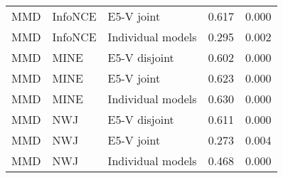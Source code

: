\begin{table}[htb]
\begin{tabular}{@{}lll|cc@{}}
MMD           & InfoNCE      & E5-V joint         & 0.617 & 0.000 \\
MMD           & InfoNCE      & Individual models & 0.295 & 0.002 \\
MMD           & MINE         & E5-V disjoint      & 0.602 & 0.000 \\
MMD           & MINE         & E5-V joint         & 0.623 & 0.000 \\
MMD           & MINE         & Individual models & 0.630 & 0.000 \\
MMD           & NWJ          & E5-V disjoint      & 0.611 & 0.000 \\
MMD           & NWJ          & E5-V joint         & 0.273 & 0.004 \\
MMD           & NWJ          & Individual models & 0.468 & 0.000 \\ \bottomrule
\end{tabular} \label{tab:ablation_emidup}
\end{table}